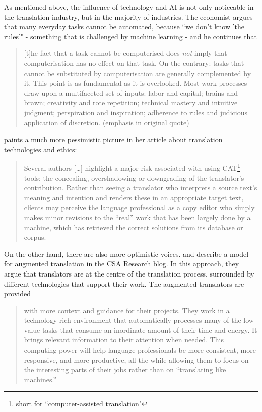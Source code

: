 As mentioned above, the influence of technology and AI is not only noticeable in the translation industry, but in the majority of industries. The economist \citet[8-9]{autor2014polanyi} argues that many everyday tasks cannot be automated, because ``we don't know 'the rules'" - something that is challenged by machine learning - and he continues that
\begin{quote}
[t]he fact that a task cannot be computerised does \textit{not} imply that computerisation has no effect on that task. On the contrary: tasks that cannot be substituted by computerisation are generally complemented by it. This point is as fundamental as it is overlooked. Most work processes draw upon a multifaceted set of inputs: labor and capital; brains and brawn; creativity and rote repetition; technical mastery and intuitive judgment; perspiration and inspiration; adherence to rules and judicious application of discretion. (emphasis in original quote)
\end{quote}

\citet[267-268]{bowker2020translation} paints a much more pessimistic picture in her article about translation technologies and ethics:
\begin{quote}
    Several authors […] highlight a major risk associated with using CAT\footnote{short for ``computer-assisted translation"} tools: the concealing, overshadowing or downgrading of the translator’s contribution. Rather than seeing a translator who interprets a source text’s meaning and intention and renders these in an appropriate target text, clients may perceive the language professional as a copy editor who simply makes minor revisions to the “real” work that has been largely done by a machine, which has retrieved the correct solutions from its database or corpus.
\end{quote}

On the other hand, there are also more optimistic voices. \citet{depalma_augmented_2017} and \citet{lommel_augmented_2020} describe a model for augmented translation in the CSA Research blog. In this approach, they argue that translators are at the centre of the translation process, surrounded by different technologies that support their work. The augmented translators are provided
\begin{quote}
    with more context and guidance for their projects. They work in a technol\-o\-gy-rich environment that automatically processes many of the low-value tasks that consume an inordinate amount of their time and energy. It brings relevant information to their attention when needed. This computing power will help language professionals be more consistent, more responsive, and more productive, all the while allowing them to focus on the interesting parts of their jobs rather than on “translating like machines.” \citep{depalma_augmented_2017}
\end{quote}


